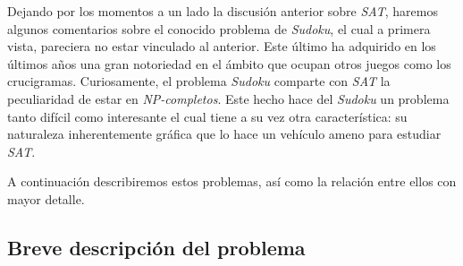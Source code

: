 \documentclass[12pt,lettersize,oneside]{article}
\begin{document}
Dejando por los momentos a un lado la discusión anterior sobre \emph{SAT},
haremos algunos comentarios sobre el conocido problema de \emph{Sudoku}, el cual
a primera vista, pareciera no estar vinculado al anterior. Este último ha
adquirido en los últimos años una gran notoriedad en el ámbito que ocupan otros
juegos como los crucigramas. Curiosamente, el problema \emph{Sudoku} comparte
con \emph{SAT} la peculiaridad de estar en \emph{NP-completos}. Este hecho hace
del \emph{Sudoku} un problema tanto difícil como interesante el cual tiene a su
vez otra característica: su naturaleza inherentemente gráfica que lo hace un
vehículo ameno para estudiar \emph{SAT}.

A continuación describiremos estos problemas, así como la relación entre ellos
con mayor detalle.

\subsection{Breve descripción del problema} 
\end{document}
